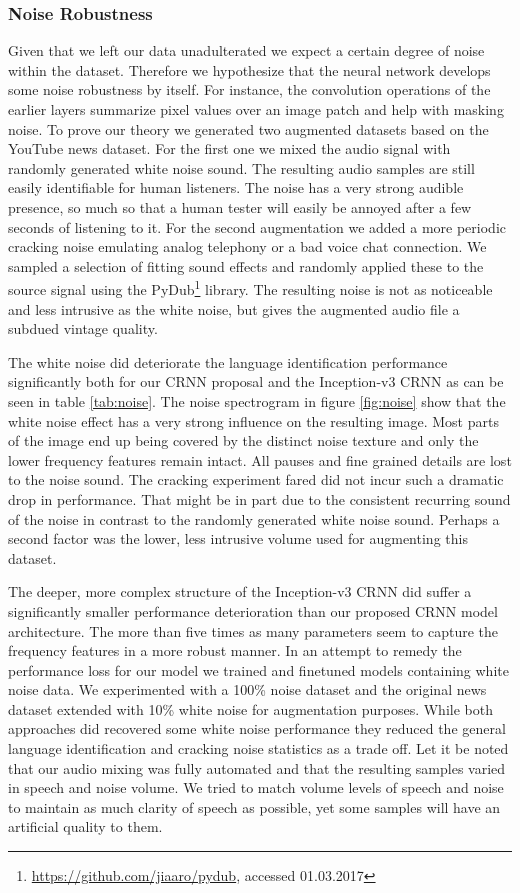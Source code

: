 \subsubsection{Noise Robustness} 
\label{sec:noise_robustness}
Given that we left our data unadulterated we expect a certain degree of noise within the dataset. Therefore we hypothesize that the neural network develops some noise robustness by itself. For instance, the convolution operations of the earlier layers summarize pixel values over an image patch and help with masking noise. To prove our theory we generated two augmented datasets based on the YouTube news dataset. 
For the first one we mixed the audio signal with randomly generated white noise sound. The resulting audio samples are still easily identifiable for human listeners. The noise has a very strong audible presence, so much so that a human tester will easily be annoyed after a few seconds of listening to it.
For the second augmentation we added a more periodic cracking noise emulating analog telephony or a bad voice chat connection. We sampled a selection of fitting sound effects and randomly applied these to the source signal using the PyDub\footnote{\url{https://github.com/jiaaro/pydub}, accessed 01.03.2017} library. The resulting noise is not as noticeable and less intrusive as the white noise, but gives the augmented audio file a subdued vintage quality.

The white noise did deteriorate the language identification performance significantly both for our CRNN proposal and the Inception-v3 CRNN as can be seen in table \ref{tab:noise}. The noise spectrogram in figure \ref{fig:noise} show that the white noise effect has a very strong influence on the resulting image. Most parts of the image end up being covered by the distinct noise texture and only the lower frequency features remain intact. All pauses and fine grained details are lost to the noise sound. 
The cracking experiment fared did not incur such a dramatic drop in performance. That might be in part due to the consistent recurring sound of the noise in contrast to the randomly generated white noise sound. Perhaps a second factor was the lower, less intrusive volume used for augmenting this dataset.

The deeper, more complex structure of the Inception-v3 CRNN did suffer a significantly smaller performance deterioration than our proposed CRNN model architecture. The more than five times as many parameters seem to capture the frequency features in a more robust manner. In an attempt to remedy the performance loss for our model we trained and finetuned models containing white noise data. We experimented with a 100\% noise dataset and the original news dataset extended with 10\% white noise for augmentation purposes. While both approaches did recovered some white noise performance they reduced the general language identification and cracking noise statistics as a trade off.
Let it be noted that our audio mixing was fully automated and that the resulting samples varied in speech and noise volume. We tried to match volume levels of speech and noise to maintain as much clarity of speech as possible, yet some samples will have an artificial quality to them.

